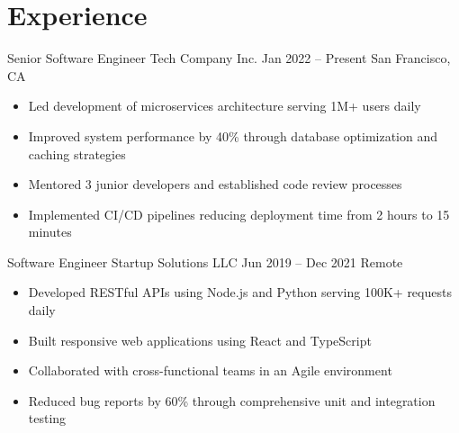 \section{Experience}

\experienceitem
    {Senior Software Engineer}           %
    {Tech Company Inc.}                  %
    {Jan 2022 -- Present}               %
    {San Francisco, CA}                  %

\begin{itemize}
    \item Led development of microservices architecture serving 1M+ users daily
    \item Improved system performance by 40\% through database optimization and caching strategies  
    \item Mentored 3 junior developers and established code review processes
    \item Implemented CI/CD pipelines reducing deployment time from 2 hours to 15 minutes
\end{itemize}

\experienceitem
    {Software Engineer}
    {Startup Solutions LLC}
    {Jun 2019 -- Dec 2021}
    {Remote}

\begin{itemize}
    \item Developed RESTful APIs using Node.js and Python serving 100K+ requests daily
    \item Built responsive web applications using React and TypeScript
    \item Collaborated with cross-functional teams in an Agile environment
    \item Reduced bug reports by 60\% through comprehensive unit and integration testing
\end{itemize}

